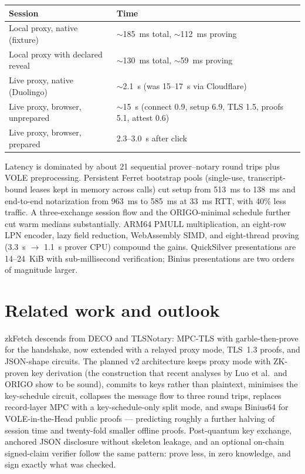 \documentclass[11pt,a4paper]{article}
\begin{document}
\begin{center}
\begin{tabular}{ll}
\toprule
Session & Time \\
\midrule
Local proxy, native (fixture) & $\sim$185~ms total, $\sim$112~ms proving \\
Local proxy with declared reveal & $\sim$130~ms total, $\sim$59~ms proving \\
Live proxy, native (Duolingo) & $\sim$2.1~s (was 15--17~s via Cloudflare) \\
Live proxy, browser, unprepared & $\sim$15~s (connect 0.9, setup 6.9, TLS 1.5, proofs 5.1, attest 0.6) \\
Live proxy, browser, prepared & 2.3--3.0~s after click \\
\bottomrule
\end{tabular}
\end{center}

Latency is dominated by about 21 sequential prover--notary round trips plus
VOLE preprocessing.
Persistent Ferret bootstrap pools (single-use, transcript-bound leases kept in
memory across calls) cut setup from 513~ms to 138~ms and end-to-end
notarization from 963~ms to 585~ms at 33~ms RTT, with 40\% less traffic.
A three-exchange session flow and the ORIGO-minimal schedule further cut warm
medians substantially.
ARM64 PMULL multiplication, an eight-row LPN encoder, lazy field reduction,
WebAssembly SIMD, and eight-thread proving (3.3~s $\rightarrow$ 1.1~s prover
CPU) compound the gains.
QuickSilver presentations are 14--24~KiB with sub-millisecond verification;
Binius presentations are two orders of magnitude larger.

\section{Related work and outlook}

zkFetch descends from DECO and TLSNotary: MPC-TLS with garble-then-prove for
the handshake, now extended with a relayed proxy mode, TLS~1.3 proofs, and
JSON-shape circuits.
The planned v2 architecture keeps proxy mode with ZK-proven key derivation
(the construction that recent analyses by Luo et al.\ and ORIGO show to be
sound), commits to keys rather than plaintext, minimises the key-schedule
circuit, collapses the message flow to three round trips, replaces record-layer
MPC with a key-schedule-only split mode, and swaps Binius64 for
VOLE-in-the-Head public proofs --- predicting roughly a further halving of
session time and twenty-fold smaller offline proofs.
Post-quantum key exchange, anchored JSON disclosure without skeleton leakage,
and an optional on-chain signed-claim verifier follow the same pattern:
prove less, in zero knowledge, and sign exactly what was checked.
\end{document}
